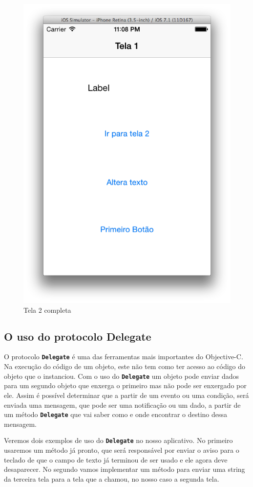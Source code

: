 \documentclass[a4paper,12pt,brazil,doubleside]{book}
\begin{document}
\begin{singlespace}
\begin{figure}[H]
  \centering
  \includegraphics[width=.55\textwidth]{figuras/3/tela_novo_projeto_47.png}
  \caption{Tela 2 completa}
  \label{fig:a}
\end{figure}

\bigskip

\subsection{O uso do protocolo Delegate}


O protocolo \texttt{\textbf{Delegate}} é uma das ferramentas mais importantes do Objective-C. Na execução do código de um objeto, este não tem como ter acesso ao código do objeto que o instanciou. Com o uso do \texttt{\textbf{Delegate}} um objeto pode enviar dados para um segundo objeto que enxerga o primeiro mas não pode ser enxergado por ele. Assim é possível determinar que a partir de um evento ou uma condição, será enviada uma mensagem, que pode ser uma notificação ou um dado, a partir de um método \texttt{\textbf{Delegate}} que vai saber como e onde encontrar o destino dessa mensagem.

Veremos dois exemplos de uso do \texttt{\textbf{Delegate}} no nosso aplicativo. No primeiro usaremos um método já pronto, que será responsável por enviar o aviso para o teclado de que o campo de texto já terminou de ser usado e ele agora deve desaparecer. No segundo vamos implementar um método para enviar uma string da terceira tela para a tela que a chamou, no nosso caso a segunda tela.


\end{singlespace}
\end{document}
